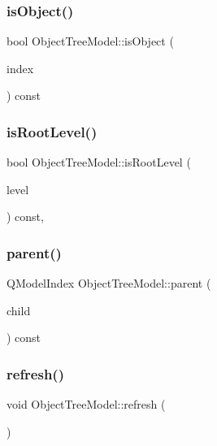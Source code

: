 \subsubsection{\texorpdfstring{isObject()}{isObject()}}
{\footnotesize\ttfamily bool Object\+Tree\+Model\+::is\+Object (\begin{DoxyParamCaption}\item[{Q\+Model\+Index}]{index }\end{DoxyParamCaption}) const}

\mbox{\label{class_object_tree_model_a7e2d94337dfc77e89a817be19196b4db}} 
\subsubsection{\texorpdfstring{isRootLevel()}{isRootLevel()}}
{\footnotesize\ttfamily bool Object\+Tree\+Model\+::is\+Root\+Level (\begin{DoxyParamCaption}\item[{const Q\+Model\+Index \&}]{level }\end{DoxyParamCaption}) const\hspace{0.3cm}{\ttfamily [inline]}, {\ttfamily [protected]}}

\mbox{\label{class_object_tree_model_a040c443c3dfe7c4eeb2ba74fce0d2dae}} 
\subsubsection{\texorpdfstring{parent()}{parent()}}
{\footnotesize\ttfamily Q\+Model\+Index Object\+Tree\+Model\+::parent (\begin{DoxyParamCaption}\item[{const Q\+Model\+Index \&}]{child }\end{DoxyParamCaption}) const}

\mbox{\label{class_object_tree_model_a2f10aa9da0633e30acd799d64a70cd09}} 
\subsubsection{\texorpdfstring{refresh()}{refresh()}}
{\footnotesize\ttfamily void Object\+Tree\+Model\+::refresh (\begin{DoxyParamCaption}{ }\end{DoxyParamCaption})}

